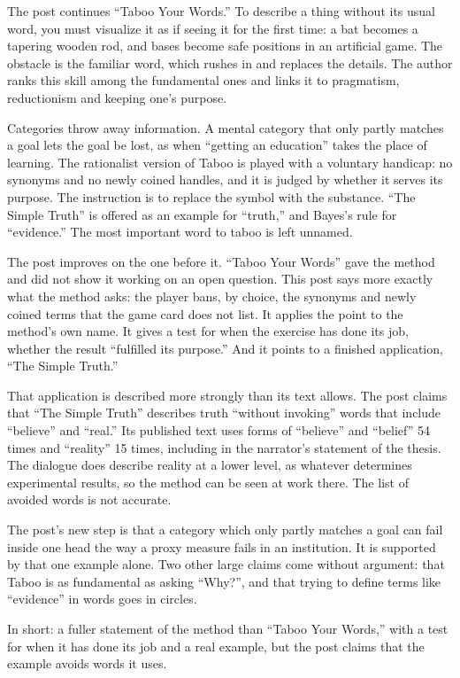 \begin{afterword}
\summaryhead

The post continues ``Taboo Your Words.'' To describe a thing without its usual word, you must visualize it as if seeing it for the first time: a bat becomes a tapering wooden rod, and bases become safe positions in an artificial game. The obstacle is the familiar word, which rushes in and replaces the details. The author ranks this skill among the fundamental ones and links it to pragmatism, reductionism and keeping one's purpose.

Categories throw away information. A mental category that only partly matches a goal lets the goal be lost, as when ``getting an education'' takes the place of learning. The rationalist version of Taboo is played with a voluntary handicap: no synonyms and no newly coined handles, and it is judged by whether it serves its purpose. The instruction is to replace the symbol with the substance. ``The Simple Truth'' is offered as an example for ``truth,'' and Bayes's rule for ``evidence.'' The most important word to taboo is left unnamed.

\responsehead

The post improves on the one before it. ``Taboo Your Words'' gave the method and did not show it working on an open question. This post says more exactly what the method asks: the player bans, by choice, the synonyms and newly coined terms that the game card does not list. It applies the point to the method's own name. It gives a test for when the exercise has done its job, whether the result ``fulfilled its purpose.'' And it points to a finished application, ``The Simple Truth.''

That application is described more strongly than its text allows. The post claims that ``The Simple Truth'' describes truth ``without invoking'' words that include ``believe'' and ``real.'' Its published text uses forms of ``believe'' and ``belief'' 54 times and ``reality'' 15 times, including in the narrator's statement of the thesis. The dialogue does describe reality at a lower level, as whatever determines experimental results, so the method can be seen at work there. The list of avoided words is not accurate.

The post's new step is that a category which only partly matches a goal can fail inside one head the way a proxy measure fails in an institution. It is supported by that one example alone. Two other large claims come without argument: that Taboo is as fundamental as asking ``Why?'', and that trying to define terms like ``evidence'' in words goes in circles.

In short: a fuller statement of the method than ``Taboo Your Words,'' with a test for when it has done its job and a real example, but the post claims that the example avoids words it uses.
\end{afterword}
